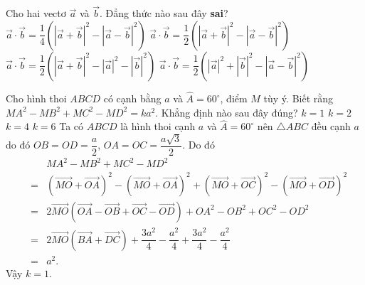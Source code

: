 \begin{ex}%
	Cho hai vectơ $\overrightarrow{a}$ và $\overrightarrow{b}$. Đẳng thức nào sau đây \textbf{sai}?
	\choice
	{$\overrightarrow{a}\cdot\overrightarrow{b}=\dfrac{1}{4}\left(\left|\overrightarrow{a}+\overrightarrow{b}\right|^2-\left|\overrightarrow{a}-\overrightarrow{b}\right|^2\right)$}
	{\True $\overrightarrow{a}\cdot\overrightarrow{b}=\dfrac{1}{2}\left(\left|\overrightarrow{a}+\overrightarrow{b}\right|^2-\left|\overrightarrow{a}-\overrightarrow{b}\right|^2\right)$}
	{$\overrightarrow{a}\cdot\overrightarrow{b}=\dfrac{1}{2}\left(\left|\overrightarrow{a}+\overrightarrow{b}\right|^2-\left|\overrightarrow{a}\right|^2-\left|\overrightarrow{b}\right|^2\right)$}
	{$\overrightarrow{a}\cdot\overrightarrow{b}=\dfrac{1}{2}\left(\left|\overrightarrow{a}\right|^2+\left|\overrightarrow{b}\right|^2-\left|\overrightarrow{a}-\overrightarrow{b}\right|^2\right)$}
\end{ex}

\begin{ex}%
	Cho hình thoi $ABCD$ có cạnh bằng $a$ và $\widehat{A}=60^\circ$, điểm $M$ tùy ý. Biết rằng
	$MA^2-MB^2+MC^2-MD^2=ka^2$. Khẳng định nào sau đây đúng?
	\choice
	{\True $k=1$}
	{$k=2$}
	{$k=4$}
	{$k=6$}
	\loigiai
	{
		Ta có $ABCD$ là hình thoi cạnh $a$ và $\widehat{A}=60^\circ$ nên $\triangle ABC$ đều cạnh $a$ do đó $OB=OD=\dfrac{a}{2}$, $OA=OC=\dfrac{a\sqrt{3}}{2}$. Do đó
		\begin{eqnarray*}
			&& MA^2-MB^2+MC^2-MD^2\\
			& = & \left(\overrightarrow{MO}+\overrightarrow{OA}\right)^2-\left(\overrightarrow{MO}+\overrightarrow{OA}\right)^2+\left(\overrightarrow{MO}+\overrightarrow{OC}\right)^2-\left(\overrightarrow{MO}+\overrightarrow{OD}\right)^2\\
			& = & 2\overrightarrow{MO}\left(\overrightarrow{OA}-\overrightarrow{OB}+\overrightarrow{OC}-\overrightarrow{OD}\right)+OA^2-OB^2+OC^2-OD^2\\
			& = & 2\overrightarrow{MO}\left(\overrightarrow{BA}+\overrightarrow{DC}\right)+\dfrac{3a^2}{4}-\dfrac{a^2}{4}+\dfrac{3a^2}{4}-\dfrac{a^2}{4}\\
			& = & a^2.
		\end{eqnarray*}
		Vậy $k=1$.
	}
\end{ex}

